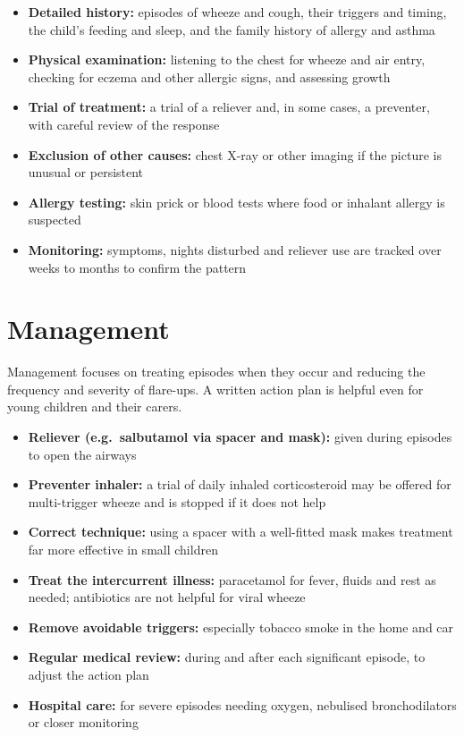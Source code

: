 \begin{itemize}
    \item \textbf{Detailed history:} episodes of wheeze and cough, their triggers and timing, the child's feeding and sleep, and the family history of allergy and asthma
    \item \textbf{Physical examination:} listening to the chest for wheeze and air entry, checking for eczema and other allergic signs, and assessing growth
    \item \textbf{Trial of treatment:} a trial of a reliever and, in some cases, a preventer, with careful review of the response
    \item \textbf{Exclusion of other causes:} chest X-ray or other imaging if the picture is unusual or persistent
    \item \textbf{Allergy testing:} skin prick or blood tests where food or inhalant allergy is suspected
    \item \textbf{Monitoring:} symptoms, nights disturbed and reliever use are tracked over weeks to months to confirm the pattern
\end{itemize}

\section*{Management}
Management focuses on treating episodes when they occur and reducing the frequency and severity of flare-ups. A written action plan is helpful even for young children and their carers.

\begin{itemize}
    \item \textbf{Reliever (e.g.\ salbutamol via spacer and mask):} given during episodes to open the airways
    \item \textbf{Preventer inhaler:} a trial of daily inhaled corticosteroid may be offered for multi-trigger wheeze and is stopped if it does not help
    \item \textbf{Correct technique:} using a spacer with a well-fitted mask makes treatment far more effective in small children
    \item \textbf{Treat the intercurrent illness:} paracetamol for fever, fluids and rest as needed; antibiotics are not helpful for viral wheeze
    \item \textbf{Remove avoidable triggers:} especially tobacco smoke in the home and car
    \item \textbf{Regular medical review:} during and after each significant episode, to adjust the action plan
    \item \textbf{Hospital care:} for severe episodes needing oxygen, nebulised bronchodilators or closer monitoring
\end{itemize}

